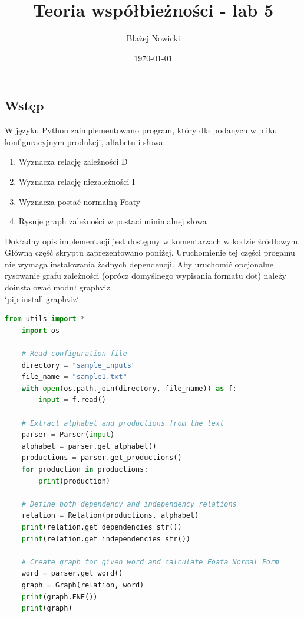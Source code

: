 \documentclass[12pt, letterpaper]{article}
\title{Teoria współbieżności - lab 5}
\author{Błażej Nowicki}
\date{\today}
\begin{document}
\maketitle
\subsection*{Wstęp}
W języku Python zaimplementowano program, który
dla podanych w pliku konfiguracyjnym produkcji, alfabetu i słowa:
\begin{enumerate}
	\item Wyznacza relację zależności D
	\item Wyznacza relację niezależności I
	\item Wyznacza postać normalną Foaty
	\item Rysuje graph zależności w postaci minimalnej słowa
\end{enumerate}
Dokładny opis implementacji jest dostępny w komentarzach w kodzie źródłowym.
Główną część skryptu zaprezentowano poniżej. Uruchomienie tej części progamu nie wymaga 
instalowania żadnych dependencji. Aby uruchomić opcjonalne rysowanie grafu zależności 
(oprócz domyślnego wypisania formatu dot) należy doinstalować moduł graphviz. \\
`pip install graphviz`
\begin{lstlisting}[language=Python]
    from utils import *
    import os

    # Read configuration file
    directory = "sample_inputs"
    file_name = "sample1.txt"
    with open(os.path.join(directory, file_name)) as f:
        input = f.read()

    # Extract alphabet and productions from the text 
    parser = Parser(input)
    alphabet = parser.get_alphabet()
    productions = parser.get_productions()
    for production in productions:
        print(production)

    # Define both dependency and independency relations
    relation = Relation(productions, alphabet)
    print(relation.get_dependencies_str())
    print(relation.get_independencies_str())

    # Create graph for given word and calculate Foata Normal Form
    word = parser.get_word()
    graph = Graph(relation, word)
    print(graph.FNF())
    print(graph)
\end{lstlisting}
\end{document}
